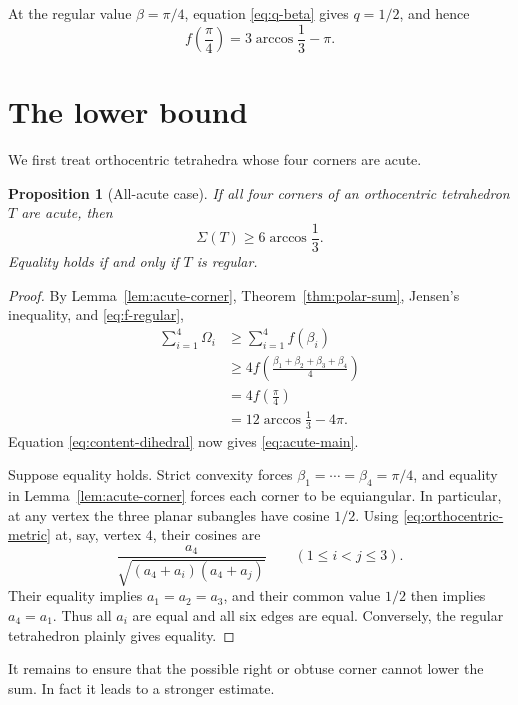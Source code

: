 \documentclass[11pt,a4paper]{article}
\newtheorem{proposition}[theorem]{Proposition}
\theoremstyle{definition}
\theoremstyle{remark}
\begin{document}
At the regular value $\beta=\pi/4$, equation \eqref{eq:q-beta} gives
$q=1/2$, and hence
\begin{equation}\label{eq:f-regular}
 f\left(\frac{\pi}{4}\right)
 =3\arccos\frac13-\pi.
\end{equation}

\section{The lower bound}\label{sec:main-proof}

We first treat orthocentric tetrahedra whose four corners are acute.

\begin{proposition}[All-acute case]\label{prop:acute-case}
If all four corners of an orthocentric tetrahedron $T$ are acute, then
\begin{equation}\label{eq:acute-main}
 \Sigma(T)\geq6\arccos\frac13.
\end{equation}
Equality holds if and only if $T$ is regular.
\end{proposition}

\begin{proof}
By Lemma~\ref{lem:acute-corner}, Theorem~\ref{thm:polar-sum}, Jensen's
inequality, and \eqref{eq:f-regular},
\begin{align*}
 \sum_{i=1}^4\Omega_i
 &\geq\sum_{i=1}^4 f(\beta_i)\\
 &\geq4f\left(\frac{\beta_1+\beta_2+\beta_3+\beta_4}{4}\right)\\
 &=4f\left(\frac{\pi}{4}\right)\\
 &=12\arccos\frac13-4\pi.
\end{align*}
Equation \eqref{eq:content-dihedral} now gives \eqref{eq:acute-main}.

Suppose equality holds.  Strict convexity forces
$\beta_1=\cdots=\beta_4=\pi/4$, and equality in
Lemma~\ref{lem:acute-corner} forces each corner to be equiangular.  In
particular, at any vertex the three planar subangles have cosine $1/2$.
Using \eqref{eq:orthocentric-metric} at, say, vertex $4$, their cosines are
\[
 \frac{a_4}{\sqrt{(a_4+a_i)(a_4+a_j)}}
 \qquad (1\leq i<j\leq3).
\]
Their equality implies $a_1=a_2=a_3$, and their common value $1/2$ then
implies $a_4=a_1$.  Thus all $a_i$ are equal and all six edges are equal.
Conversely, the regular tetrahedron plainly gives equality.
\end{proof}

It remains to ensure that the possible right or obtuse corner cannot lower
the sum.  In fact it leads to a stronger estimate.
\end{document}
